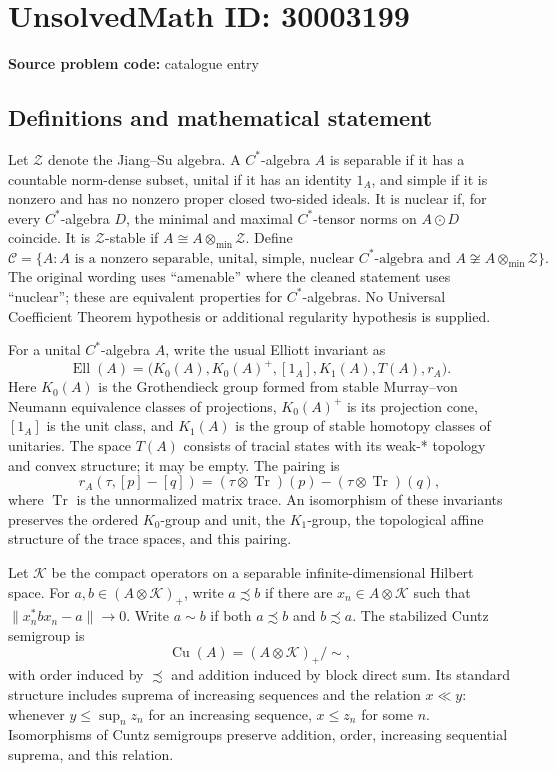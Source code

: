 \documentclass[11pt]{article}
\begin{document}
\section*{UnsolvedMath ID: 30003199}
\textbf{Source problem code:} catalogue entry
\subsection{Definitions and mathematical statement}
Let \(\mathcal Z\) denote the Jiang--Su algebra. A \(C^*\)-algebra \(A\) is separable if it has a countable norm-dense subset, unital if it has an identity \(1_A\), and simple if it is nonzero and has no nonzero proper closed two-sided ideals. It is nuclear if, for every \(C^*\)-algebra \(D\), the minimal and maximal \(C^*\)-tensor norms on \(A\odot D\) coincide. It is \(\mathcal Z\)-stable if \(A\cong A\otimes_{\min}\mathcal Z\). Define
\[
\mathscr C=\{A: A\text{ is a nonzero separable, unital, simple, nuclear }C^*\text{-algebra and }A\not\cong A\otimes_{\min}\mathcal Z\}.
\]
The original wording uses ``amenable'' where the cleaned statement uses ``nuclear''; these are equivalent properties for \(C^*\)-algebras. No Universal Coefficient Theorem hypothesis or additional regularity hypothesis is supplied.

For a unital \(C^*\)-algebra \(A\), write the usual Elliott invariant as
\[
\operatorname{Ell}(A)=\bigl(K_0(A),K_0(A)^+,[1_A],K_1(A),T(A),r_A\bigr).
\]
Here \(K_0(A)\) is the Grothendieck group formed from stable Murray--von Neumann equivalence classes of projections, \(K_0(A)^+\) is its projection cone, \([1_A]\) is the unit class, and \(K_1(A)\) is the group of stable homotopy classes of unitaries. The space \(T(A)\) consists of tracial states with its weak-* topology and convex structure; it may be empty. The pairing is
\[
r_A(\tau,[p]-[q])=(\tau\otimes\operatorname{Tr})(p)-(\tau\otimes\operatorname{Tr})(q),
\]
where \(\operatorname{Tr}\) is the unnormalized matrix trace. An isomorphism of these invariants preserves the ordered \(K_0\)-group and unit, the \(K_1\)-group, the topological affine structure of the trace spaces, and this pairing.

Let \(\mathcal K\) be the compact operators on a separable infinite-dimensional Hilbert space. For \(a,b\in(A\otimes\mathcal K)_+\), write \(a\precsim b\) if there are \(x_n\in A\otimes\mathcal K\) such that \(\|x_n^*bx_n-a\|\to0\). Write \(a\sim b\) if both \(a\precsim b\) and \(b\precsim a\). The stabilized Cuntz semigroup is
\[
\operatorname{Cu}(A)=(A\otimes\mathcal K)_+/\!\sim,
\]
with order induced by \(\precsim\) and addition induced by block direct sum. Its standard structure includes suprema of increasing sequences and the relation \(x\ll y\): whenever \(y\leq\sup_n z_n\) for an increasing sequence, \(x\leq z_n\) for some \(n\). Isomorphisms of Cuntz semigroups preserve addition, order, increasing sequential suprema, and this relation.
\end{document}
